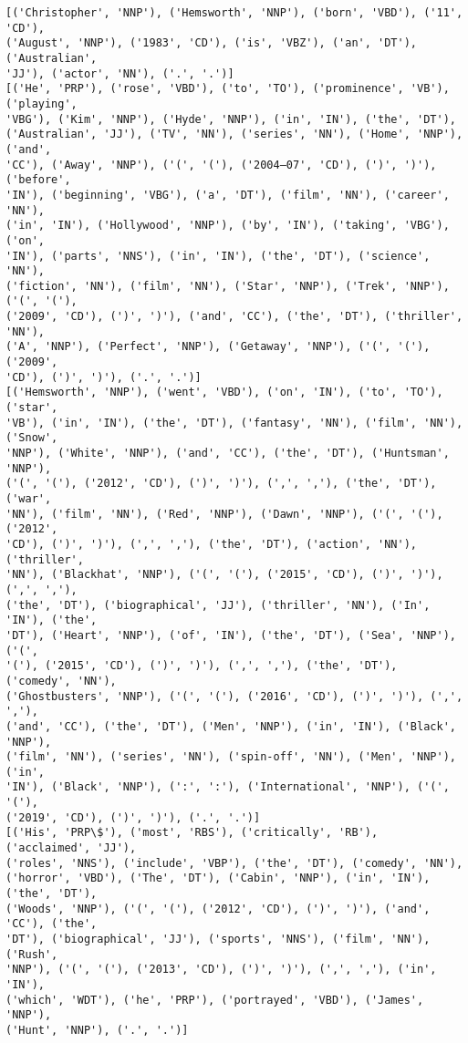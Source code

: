 \documentclass[11pt]{article}
\begin{document}
    \begin{Verbatim}[commandchars=\\\{\}]
[('Christopher', 'NNP'), ('Hemsworth', 'NNP'), ('born', 'VBD'), ('11', 'CD'),
('August', 'NNP'), ('1983', 'CD'), ('is', 'VBZ'), ('an', 'DT'), ('Australian',
'JJ'), ('actor', 'NN'), ('.', '.')]
[('He', 'PRP'), ('rose', 'VBD'), ('to', 'TO'), ('prominence', 'VB'), ('playing',
'VBG'), ('Kim', 'NNP'), ('Hyde', 'NNP'), ('in', 'IN'), ('the', 'DT'),
('Australian', 'JJ'), ('TV', 'NN'), ('series', 'NN'), ('Home', 'NNP'), ('and',
'CC'), ('Away', 'NNP'), ('(', '('), ('2004–07', 'CD'), (')', ')'), ('before',
'IN'), ('beginning', 'VBG'), ('a', 'DT'), ('film', 'NN'), ('career', 'NN'),
('in', 'IN'), ('Hollywood', 'NNP'), ('by', 'IN'), ('taking', 'VBG'), ('on',
'IN'), ('parts', 'NNS'), ('in', 'IN'), ('the', 'DT'), ('science', 'NN'),
('fiction', 'NN'), ('film', 'NN'), ('Star', 'NNP'), ('Trek', 'NNP'), ('(', '('),
('2009', 'CD'), (')', ')'), ('and', 'CC'), ('the', 'DT'), ('thriller', 'NN'),
('A', 'NNP'), ('Perfect', 'NNP'), ('Getaway', 'NNP'), ('(', '('), ('2009',
'CD'), (')', ')'), ('.', '.')]
[('Hemsworth', 'NNP'), ('went', 'VBD'), ('on', 'IN'), ('to', 'TO'), ('star',
'VB'), ('in', 'IN'), ('the', 'DT'), ('fantasy', 'NN'), ('film', 'NN'), ('Snow',
'NNP'), ('White', 'NNP'), ('and', 'CC'), ('the', 'DT'), ('Huntsman', 'NNP'),
('(', '('), ('2012', 'CD'), (')', ')'), (',', ','), ('the', 'DT'), ('war',
'NN'), ('film', 'NN'), ('Red', 'NNP'), ('Dawn', 'NNP'), ('(', '('), ('2012',
'CD'), (')', ')'), (',', ','), ('the', 'DT'), ('action', 'NN'), ('thriller',
'NN'), ('Blackhat', 'NNP'), ('(', '('), ('2015', 'CD'), (')', ')'), (',', ','),
('the', 'DT'), ('biographical', 'JJ'), ('thriller', 'NN'), ('In', 'IN'), ('the',
'DT'), ('Heart', 'NNP'), ('of', 'IN'), ('the', 'DT'), ('Sea', 'NNP'), ('(',
'('), ('2015', 'CD'), (')', ')'), (',', ','), ('the', 'DT'), ('comedy', 'NN'),
('Ghostbusters', 'NNP'), ('(', '('), ('2016', 'CD'), (')', ')'), (',', ','),
('and', 'CC'), ('the', 'DT'), ('Men', 'NNP'), ('in', 'IN'), ('Black', 'NNP'),
('film', 'NN'), ('series', 'NN'), ('spin-off', 'NN'), ('Men', 'NNP'), ('in',
'IN'), ('Black', 'NNP'), (':', ':'), ('International', 'NNP'), ('(', '('),
('2019', 'CD'), (')', ')'), ('.', '.')]
[('His', 'PRP\$'), ('most', 'RBS'), ('critically', 'RB'), ('acclaimed', 'JJ'),
('roles', 'NNS'), ('include', 'VBP'), ('the', 'DT'), ('comedy', 'NN'),
('horror', 'VBD'), ('The', 'DT'), ('Cabin', 'NNP'), ('in', 'IN'), ('the', 'DT'),
('Woods', 'NNP'), ('(', '('), ('2012', 'CD'), (')', ')'), ('and', 'CC'), ('the',
'DT'), ('biographical', 'JJ'), ('sports', 'NNS'), ('film', 'NN'), ('Rush',
'NNP'), ('(', '('), ('2013', 'CD'), (')', ')'), (',', ','), ('in', 'IN'),
('which', 'WDT'), ('he', 'PRP'), ('portrayed', 'VBD'), ('James', 'NNP'),
('Hunt', 'NNP'), ('.', '.')]
    \end{Verbatim}
\end{document}
